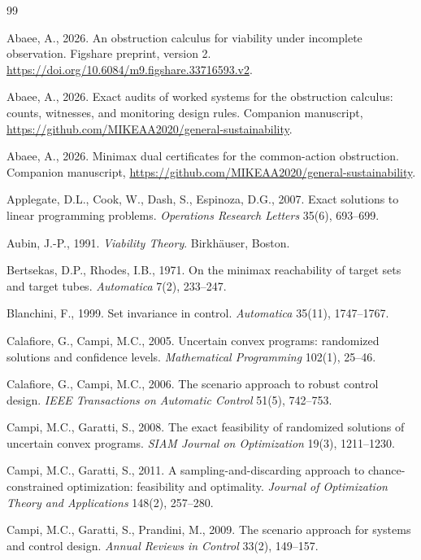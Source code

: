 \begin{thebibliography}{99}\footnotesize

 Abaee, A., 2026. An obstruction calculus for viability under incomplete observation. Figshare preprint, version 2. \url{https://doi.org/10.6084/m9.figshare.33716593.v2}.

 Abaee, A., 2026. Exact audits of worked systems for the obstruction calculus: counts, witnesses, and monitoring design rules. Companion manuscript, \url{https://github.com/MIKEAA2020/general-sustainability}.

 Abaee, A., 2026. Minimax dual certificates for the common-action obstruction. Companion manuscript, \url{https://github.com/MIKEAA2020/general-sustainability}.

 Applegate, D.L., Cook, W., Dash, S., Espinoza, D.G., 2007. Exact solutions to linear programming problems. \emph{Operations Research Letters} 35(6), 693--699.

 Aubin, J.-P., 1991. \emph{Viability Theory}. Birkh\"auser, Boston.

 Bertsekas, D.P., Rhodes, I.B., 1971. On the minimax reachability of target sets and target tubes. \emph{Automatica} 7(2), 233--247.

 Blanchini, F., 1999. Set invariance in control. \emph{Automatica} 35(11), 1747--1767.

 Calafiore, G., Campi, M.C., 2005. Uncertain convex programs: randomized solutions and confidence levels. \emph{Mathematical Programming} 102(1), 25--46.

 Calafiore, G., Campi, M.C., 2006. The scenario approach to robust control design. \emph{IEEE Transactions on Automatic Control} 51(5), 742--753.

 Campi, M.C., Garatti, S., 2008. The exact feasibility of randomized solutions of uncertain convex programs. \emph{SIAM Journal on Optimization} 19(3), 1211--1230.

 Campi, M.C., Garatti, S., 2011. A sampling-and-discarding approach to chance-constrained optimization: feasibility and optimality. \emph{Journal of Optimization Theory and Applications} 148(2), 257--280.

 Campi, M.C., Garatti, S., Prandini, M., 2009. The scenario approach for systems and control design. \emph{Annual Reviews in Control} 33(2), 149--157.


\end{thebibliography}
